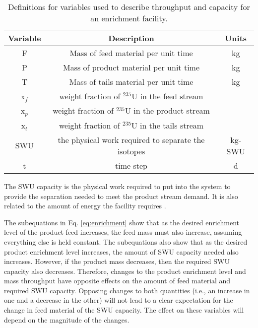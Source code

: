 \begin{table}
    \centering
    \caption{Definitions for variables used to describe throughput and 
    capacity for an enrichment facility.}
    \label{tab:enrichment_variables}
    \begin{tabular}{c c c}
        \hline
        Variable & Description & Units\\\hline
        F & Mass of feed material per unit time & kg\\
        P & Mass of product material per unit time & kg \\
        T & Mass of tails material per unit time & kg\\
        x$_f$ & weight fraction of $^{235}$U in the feed stream &\\
        x$_p$ & weight fraction of $^{235}$U in the product stream & \\
        x$_t$ & weight fraction of $^{235}$U in the tails stream & \\
        \gls{SWU} & the physical work required to separate the isotopes & kg-SWU\\
        t & time step & d\\
        \hline
    \end{tabular}
\end{table}

\noindent The \gls{SWU} capacity 
is the physical work required to put into the system to provide the 
separation needed to meet the product stream demand. It is also related 
to the amount of energy the facility 
requires \cite{tsoulfanidis_nuclear_2013}. 

The subequations in Eq. \ref{eq:enrichment} show that as the desired enrichment level 
of the product feed increases, the feed mass must also increase, assuming everything 
else is held constant. The subequations also show that as the desired 
product 
enrichment level increases, the amount of \gls{SWU} capacity needed also increases. 
However, if the product mass decreases, then the required \gls{SWU} capacity 
also decreases. Therefore, changes to the product enrichment level and mass 
throughput have opposite effects on the amount of feed material and required 
\gls{SWU} capacity. Opposing changes to both quantities 
(i.e., an increase in one and a decrease in the other) will not lead to a clear 
expectation for the change in feed material of the \gls{SWU} capacity. 
The effect 
on these variables will depend on the magnitude of the changes.

